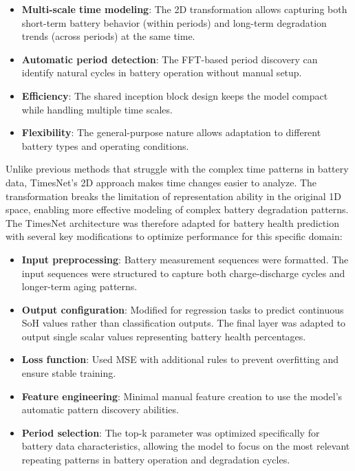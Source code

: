 \begin{itemize}
\item \textbf{Multi-scale time modeling}: The 2D transformation allows capturing both short-term battery behavior (within periods) and long-term degradation trends (across periods) at the same time.
\item \textbf{Automatic period detection}: The FFT-based period discovery can identify natural cycles in battery operation without manual setup.
\item \textbf{Efficiency}: The shared inception block design keeps the model compact while handling multiple time scales.
\item \textbf{Flexibility}: The general-purpose nature allows adaptation to different battery types and operating conditions.
\end{itemize}

Unlike previous methods that struggle with the complex time patterns in battery data, TimesNet's 2D approach makes time changes easier to analyze. The transformation breaks the limitation of representation ability in the original 1D space, enabling more effective modeling of complex battery degradation patterns. The TimesNet architecture was therefore adapted for battery health prediction with several key modifications to optimize performance for this specific domain:

\begin{itemize}
    \item \textbf{Input preprocessing}: Battery measurement sequences were formatted. The input sequences were structured to capture both charge-discharge cycles and longer-term aging patterns.
    \item \textbf{Output configuration}: Modified for regression tasks to predict continuous SoH values rather than classification outputs. The final layer was adapted to output single scalar values representing battery health percentages.
    \item \textbf{Loss function}: Used MSE with additional rules to prevent overfitting and ensure stable training.
    \item \textbf{Feature engineering}: Minimal manual feature creation to use the model's automatic pattern discovery abilities. 
    \item \textbf{Period selection}: The top-k parameter was optimized specifically for battery data characteristics, allowing the model to focus on the most relevant repeating patterns in battery operation and degradation cycles.
\end{itemize}

